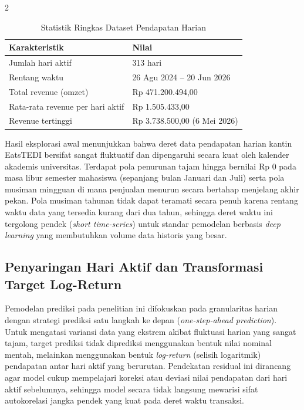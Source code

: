 \documentclass[12pt, a4paper, onecolumn, oneside]{report}
\begin{document}
\begin{spacing}{2}
\begin{table}[H]
\centering
\caption{Statistik Ringkas Dataset Pendapatan Harian}
\label{tab:statistik_revenue_harian}
\begin{tabular}{|l|l|}
\hline
\textbf{Karakteristik} & \textbf{Nilai} \\ \hline
Jumlah hari aktif & 313 hari \\ \hline
Rentang waktu & 26 Agu 2024 -- 20 Jun 2026 \\ \hline
Total revenue (omzet) & Rp 471.200.494,00 \\ \hline
Rata-rata revenue per hari aktif & Rp 1.505.433,00 \\ \hline
Revenue tertinggi & Rp 3.738.500,00 (6 Mei 2026) \\ \hline
\end{tabular}
\end{table}

Hasil eksplorasi awal menunjukkan bahwa deret data pendapatan harian kantin EatsTEDI bersifat sangat fluktuatif dan dipengaruhi secara kuat oleh kalender akademis universitas. Terdapat pola penurunan tajam hingga bernilai Rp 0 pada masa libur semester mahasiswa (sepanjang bulan Januari dan Juli) serta pola musiman mingguan di mana penjualan menurun secara bertahap menjelang akhir pekan. Pola musiman tahunan tidak dapat teramati secara penuh karena rentang waktu data yang tersedia kurang dari dua tahun, sehingga deret waktu ini tergolong pendek (\textit{short time-series}) untuk standar pemodelan berbasis \textit{deep learning} yang membutuhkan volume data historis yang besar.

\subsection{Penyaringan Hari Aktif dan Transformasi Target Log-Return}

Pemodelan prediksi pada penelitian ini difokuskan pada granularitas harian dengan strategi prediksi satu langkah ke depan (\textit{one-step-ahead prediction}). Untuk mengatasi variansi data yang ekstrem akibat fluktuasi harian yang sangat tajam, target prediksi tidak diprediksi menggunakan bentuk nilai nominal mentah, melainkan menggunakan bentuk \textit{log-return} (selisih logaritmik) pendapatan antar hari aktif yang berurutan. Pendekatan residual ini dirancang agar model cukup mempelajari koreksi atau deviasi nilai pendapatan dari hari aktif sebelumnya, sehingga model secara tidak langsung mewarisi sifat autokorelasi jangka pendek yang kuat pada deret waktu transaksi.


\end{spacing}
\end{document}
